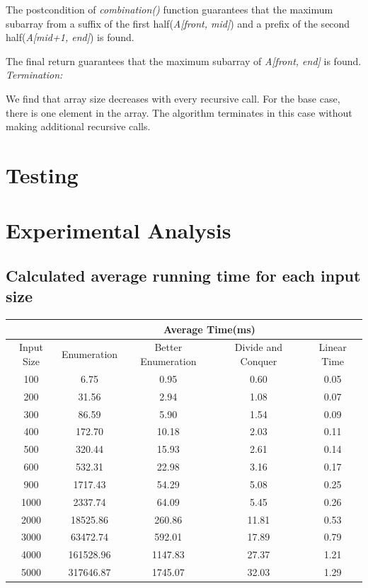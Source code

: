 \documentclass[11pt]{scrreprt}
\begin{document}
The postcondition of \textit{combination()} function guarantees that the maximum subarray from a suffix of the first half(\textit{A[front, mid]}) and a prefix of the second half(\textit{A[mid+1, end]}) is found.

The final return guarantees that the maximum subarray of \textit{A[front, end]} is found. \\
\emph{Termination:}

We find that array size decreases with every recursive call. For the base case, there is one element in the array. The algorithm terminates in this case without making additional recursive calls.


\chapter{Testing}



\chapter{Experimental Analysis}

\section {Calculated average running time for each input size}

\begin{tabular}{|c|c|c|c|c|}
	\hline  & \multicolumn{4}{|c|}{Average Time(ms)} \\ 
	\hline Input Size & Enumeration & Better Enumeration & Divide and Conquer & Linear Time \\ 
	\hline  100 & 6.75 & 0.95 & 0.60 & 0.05 \\ 
	\hline  200 & 31.56 & 2.94 & 1.08 & 0.07 \\ 
	\hline  300 & 86.59 & 5.90 & 1.54 & 0.09 \\ 
	\hline  400 & 172.70 & 10.18 & 2.03 & 0.11 \\ 
	\hline  500 & 320.44 & 15.93 & 2.61 & 0.14 \\ 
	\hline  600 & 532.31 & 22.98 & 3.16 & 0.17 \\ 
	\hline  900 & 1717.43 & 54.29 & 5.08 & 0.25 \\ 
	\hline  1000 & 2337.74 & 64.09 & 5.45 & 0.26 \\ 
	\hline  2000 & 18525.86 & 260.86 & 11.81 & 0.53 \\ 
	\hline  3000 & 63472.74 & 592.01 & 17.89 & 0.79 \\ 
	\hline  4000 & 161528.96 & 1147.83 & 27.37 & 1.21 \\ 
	\hline  5000 & 317646.87 & 1745.07 & 32.03 & 1.29 \\
	\hline 
\end{tabular} 
\end{document}

